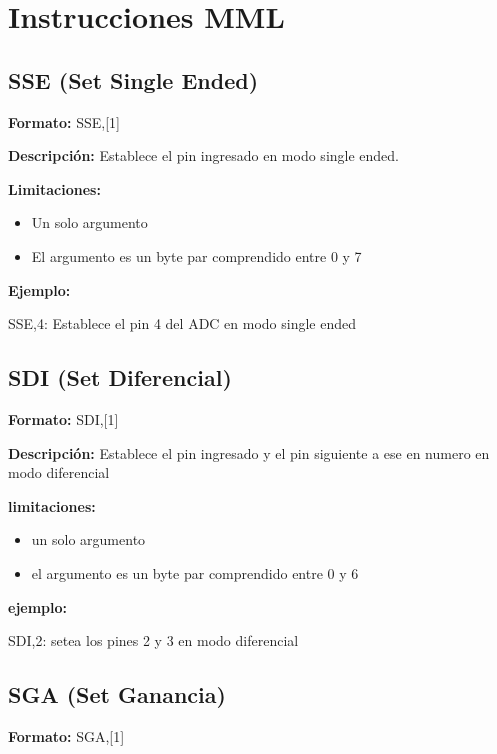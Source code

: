 \section{Instrucciones MML} %
\label{sec:instrucciones_mml}


\subsection{SSE (Set Single Ended)} %
\label{sub:sse_set_single_ended}


\textbf{Formato:} SSE,[1]

\textbf{Descripci\'on:}
Establece el pin ingresado en modo single ended.

\textbf{Limitaciones:}
\begin{itemize}
  \item Un solo argumento
  \item El argumento es un byte par comprendido entre 0 y 7
\end{itemize}

\textbf{Ejemplo:}

SSE,4: Establece el pin 4 del ADC en modo single ended


\subsection{SDI (Set Diferencial)} %
\label{sub:sdi_set_diferencial}


\textbf{Formato:} SDI,[1]

\textbf{Descripci\'on:}
Establece el pin ingresado y el pin siguiente a ese en numero en modo diferencial

\textbf{limitaciones:}
\begin{itemize}
  \item un solo argumento
  \item el argumento es un byte par comprendido entre 0 y 6
\end{itemize}

\textbf{ejemplo:}

SDI,2: setea los pines 2 y 3 en modo diferencial

\subsection{SGA (Set Ganancia)} %
\label{sub:sga_set_ganancia}


\textbf{Formato:} SGA,[1]

